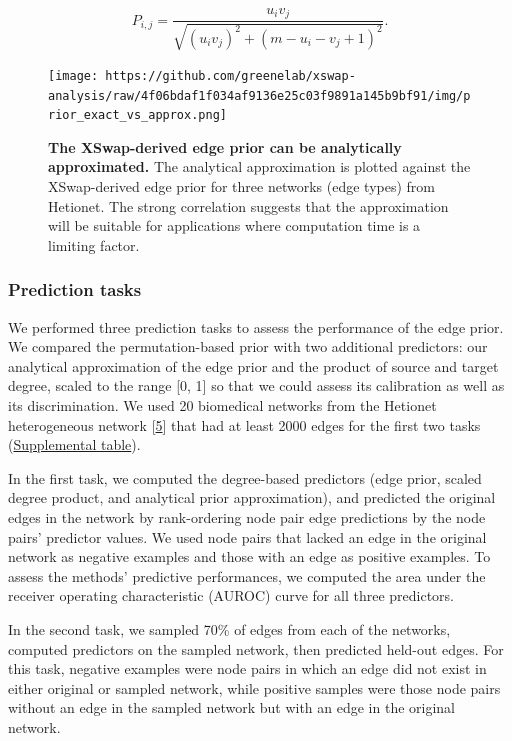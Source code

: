 \[
  P_{i,j} = \frac{u_i v_j}{\sqrt{(u_i v_j)^2 + (m - u_i - v_j + 1)^2}}.
\]

\begin{figure}
\hypertarget{fig:approx-quality}{%
\centering
\texttt{[image: https://github.com/greenelab/xswap-analysis/raw/4f06bdaf1f034af9136e25c03f9891a145b9bf91/img/prior\_exact\_vs\_approx.png]}
\caption{\textbf{The XSwap-derived edge prior can be analytically approximated.}
The analytical approximation is plotted against the XSwap-derived edge prior for three networks (edge types) from Hetionet.
The strong correlation suggests that the approximation will be suitable for applications where computation time is a limiting factor.}\label{fig:approx-quality}
}
\end{figure}

\hypertarget{tasks}{%
\subsubsection{Prediction tasks}\label{tasks}}

We performed three prediction tasks to assess the performance of the edge prior.
We compared the permutation-based prior with two additional predictors: our analytical approximation of the edge prior and the product of source and target degree, scaled to the range {[}0, 1{]} so that we could assess its calibration as well as its discrimination.
We used 20 biomedical networks from the Hetionet heterogeneous network {[}\protect\hyperlink{ref-O21tn8vf}{5}{]} that had at least 2000 edges for the first two tasks (\protect\hyperlink{networks}{Supplemental table}).

In the first task, we computed the degree-based predictors (edge prior, scaled degree product, and analytical prior approximation), and predicted the original edges in the network by rank-ordering node pair edge predictions by the node pairs' predictor values.
We used node pairs that lacked an edge in the original network as negative examples and those with an edge as positive examples.
To assess the methods' predictive performances, we computed the area under the receiver operating characteristic (AUROC) curve for all three predictors.

In the second task, we sampled 70\% of edges from each of the networks, computed predictors on the sampled network, then predicted held-out edges.
For this task, negative examples were node pairs in which an edge did not exist in either original or sampled network, while positive samples were those node pairs without an edge in the sampled network but with an edge in the original network.


